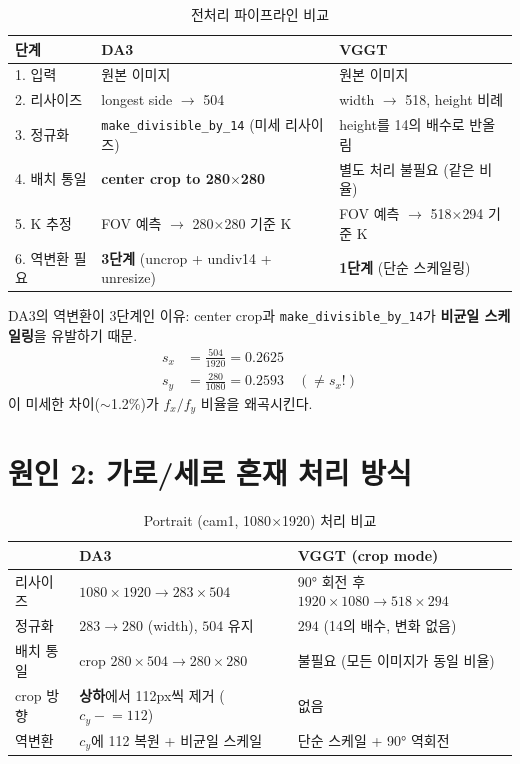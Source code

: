 \documentclass[11pt, a4paper]{report}
\begin{document}
\begin{table}[H]
\centering
\caption{전처리 파이프라인 비교}
\renewcommand{\arraystretch}{1.4}
\begin{tabular}{p{3cm} p{5.5cm} p{5.5cm}}
\toprule
\textbf{단계} & \textbf{DA3} & \textbf{VGGT} \\
\midrule
1. 입력 & 원본 이미지 & 원본 이미지 \\
2. 리사이즈 & longest side $\rightarrow$ 504 & width $\rightarrow$ 518, height 비례 \\
3. 정규화 & \texttt{make\_divisible\_by\_14} (미세 리사이즈) & height를 14의 배수로 반올림 \\
4. 배치 통일 & \textbf{center crop to 280$\times$280} & 별도 처리 불필요 (같은 비율) \\
5. K 추정 & FOV 예측 $\rightarrow$ 280$\times$280 기준 K & FOV 예측 $\rightarrow$ 518$\times$294 기준 K \\
6. 역변환 필요 & \textbf{3단계} (uncrop + undiv14 + unresize) & \textbf{1단계} (단순 스케일링) \\
\bottomrule
\end{tabular}
\end{table}

\begin{importantnote}
DA3의 역변환이 3단계인 이유: center crop과 \texttt{make\_divisible\_by\_14}가 \textbf{비균일 스케일링}을 유발하기 때문.
\begin{align*}
s_x &= \frac{504}{1920} = 0.2625 \\
s_y &= \frac{280}{1080} = 0.2593 \quad (\neq s_x!)
\end{align*}
이 미세한 차이($\sim$1.2\%)가 $f_x/f_y$ 비율을 왜곡시킨다.
\end{importantnote}


\section{원인 2: 가로/세로 혼재 처리 방식}

\begin{table}[H]
\centering
\caption{Portrait (cam1, 1080$\times$1920) 처리 비교}
\renewcommand{\arraystretch}{1.3}
\begin{tabular}{l p{6cm} p{6cm}}
\toprule
& \textbf{DA3} & \textbf{VGGT (crop mode)} \\
\midrule
리사이즈 & $1080\times1920 \rightarrow 283\times504$ & 90° 회전 후 $1920\times1080 \rightarrow 518\times294$ \\
정규화 & $283\rightarrow280$ (width), $504$ 유지 & $294$ (14의 배수, 변화 없음) \\
배치 통일 & crop $280\times504 \rightarrow 280\times280$ & 불필요 (모든 이미지가 동일 비율) \\
\midrule
crop 방향 & \textbf{상하}에서 112px씩 제거 ($c_y \mathrel{-}= 112$) & 없음 \\
역변환 & $c_y$에 112 복원 + 비균일 스케일 & 단순 스케일 + 90° 역회전 \\
\bottomrule
\end{tabular}
\end{table}
\end{document}

